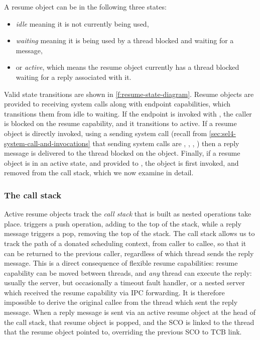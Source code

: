 A resume object can be in the following three states:
\begin{itemize}
    \item \emph{idle} meaning it is not currently being used,
    \item \emph{waiting} meaning it is being used by a thread blocked and waiting for a message, 
    \item or \emph{active}, which means the resume object currently has a thread blocked waiting for a reply associated with it.
\end{itemize}
Valid state transitions are shown in \cref{f:resume-state-diagram}. Resume objects are provided to
receiving system calls along with endpoint capabilities, which transitions them from idle to
waiting.
If the endpoint is invoked with \call, the caller is blocked on the resume capability, and
it transitions to active.  
If a resume object is directly invoked, using a sending system call (recall from
\cref{sec:sel4-system-call-and-invocations} that sending system calls are \send,
\nbsend, \call, \reply) then a reply message is delivered to the thread blocked on
the object. Finally, if a resume object is in an active state, and provided to \recv, the object
is first invoked, and removed from the call stack, which we now examine in detail. 


\subsubsection{The call stack}

Active resume objects track the \emph{call stack} that is built as nested \call operations take
place. \call triggers a push operation, adding to the top of the stack, while a reply message
triggers a
pop, removing the top of the stack.  The call stack allows us to track the path of a donated
scheduling context, from caller to callee, so that it can be returned to the previous caller,
regardless of which thread sends the reply message. This is a direct consequence of flexible resume
capabilities: resume capability can be moved between threads, and \emph{any} thread can execute the
reply: usually the server, but occasionally a timeout fault handler, or a nested server which
received the resume capability via \gls{IPC} forwarding. It is therefore impossible to derive the
original callee from the thread which sent the reply message. When a reply message is sent via an 
active resume object at the head of the call stack, that resume object is popped, and the SCO is
linked to the thread that the resume object pointed to, overriding the previous \gls{SCO} to
\gls{TCB} link.

